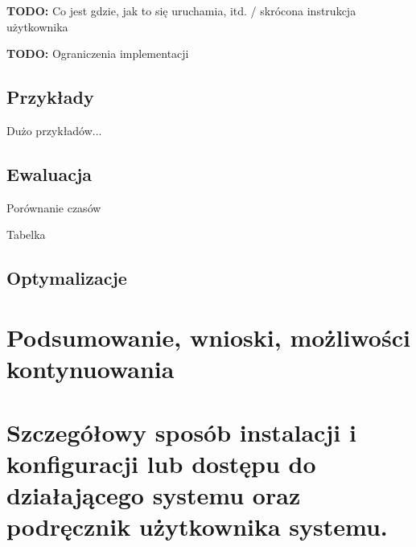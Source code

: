 \documentclass[english,shortabstract,mgr]{iithesis}
\newcommand{\todo}[1]{\textbf{TODO:} #1}
\begin{document}
\todo{Co jest gdzie, jak to się uruchamia, itd. / skrócona instrukcja użytkownika}

\todo{Ograniczenia implementacji}

\section{Przykłady}

Dużo przykładów...

\section{Ewaluacja}

Porównanie czasów

Tabelka

\section{Optymalizacje}

\chapter{Podsumowanie, wnioski, możliwości kontynuowania}

\appendix

\chapter{Szczegółowy sposób instalacji i konfiguracji lub dostępu do działającego systemu oraz podręcznik użytkownika systemu.}


\end{document}
